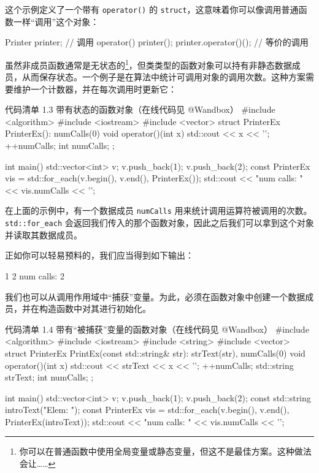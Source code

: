这个示例定义了一个带有 \texttt{operator()} 的 \texttt{struct}，这意味着你可以像调用普通函数一样“调用”这个对象：

\begin{codebox}
Printer printer;
// 调用 operator()
printer();
printer.operator()(); // 等价的调用
\end{codebox}

虽然非成员函数通常是无状态的\footnote{你可以在普通函数中使用全局变量或静态变量，但这不是最佳方案。这种做法会让……}，但类类型的函数对象可以持有非静态数据成员，从而保存状态。一个例子是在算法中统计可调用对象的调用次数。这种方案需要维护一个计数器，并在每次调用时更新它：

\begin{codeboxt}{代码清单 1.3 带有状态的函数对象（在线代码见 @Wandbox）}
#include <algorithm>
#include <iostream>
#include <vector>
struct PrinterEx {
PrinterEx(): numCalls(0) { }
void operator()(int x) {
std::cout << x << '\n';
++numCalls;
}
int numCalls;
};

int main() {
std::vector<int> v;
v.push_back(1);
v.push_back(2);
const PrinterEx vis = std::for_each(v.begin(), v.end(), PrinterEx());
std::cout << "num calls: " << vis.numCalls << '\n';
}
\end{codeboxt}

在上面的示例中，有一个数据成员 \texttt{numCalls} 用来统计调用运算符被调用的次数。\texttt{std::for\_each} 会返回我们传入的那个函数对象，因此之后我们可以拿到这个对象并读取其数据成员。

正如你可以轻易预料的，我们应当得到如下输出：

\begin{codebox}
1
2
num calls: 2
\end{codebox}

我们也可以从调用作用域中“捕获”变量。为此，必须在函数对象中创建一个数据成员，并在构造函数中对其进行初始化。

\begin{codeboxt}{代码清单 1.4 带有“被捕获”变量的函数对象（在线代码见 @Wandbox）}
#include <algorithm>
#include <iostream>
#include <string>
#include <vector>
struct PrinterEx {
PrintEx(const std::string& str):
strText(str), numCalls(0) { }
void operator()(int x) {
std::cout << strText << x << '\n';
++numCalls;
}
std::string strText;
int numCalls;
};

int main() {
std::vector<int> v;
v.push_back(1);
v.push_back(2);
const std::string introText("Elem: ");
const PrinterEx vis = std::for_each(v.begin(), v.end(),
PrinterEx(introText));
std::cout << "num calls: " << vis.numCalls << '\n';
}
\end{codeboxt}


